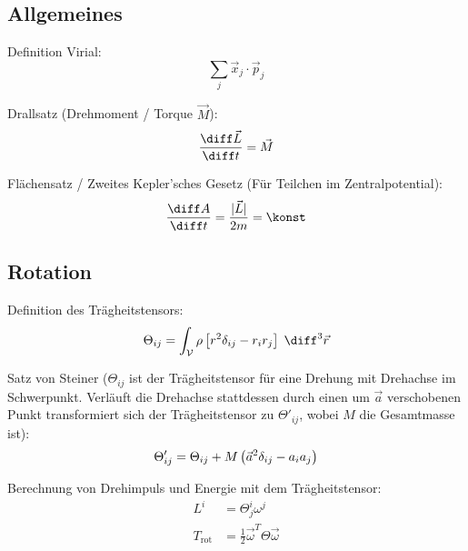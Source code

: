 \documentclass[11pt]{article}
\numberwithin{equation}{section}
\begin{document}
      \subsection{Allgemeines}
        Definition Virial:
        \begin{equation}
          \sum_j \vec{x}_j\cdot\vec{p}_j
        \end{equation}

        Drallsatz (Drehmoment / Torque $\vec{M}$):
        \begin{equation}
          \tder{\vec{L}}{t} = \vec{M}
        \end{equation}

        Flächensatz / Zweites Kepler'sches Gesetz (Für Teilchen im Zentralpotential):
        \begin{equation}
          \tder{A}{t} = \frac{\vbr{\vec{L}}}{2 m} = \konst
        \end{equation}

      \subsection{Rotation}
        Definition des Trägheitstensors:
        \begin{equation}
          \Theta_{ij}=\int_{\mathcal{V}} \rho \left[r^2\delta_{ij}-r_i r_j\right] \;\diff^3\vec{r}
        \end{equation}

        Satz von Steiner ($\Theta_{ij}$ ist der Trägheitstensor für eine Drehung mit Drehachse im Schwerpunkt. Verläuft die Drehachse stattdessen durch einen um $\vec{a}$ verschobenen Punkt transformiert sich der Trägheitstensor zu $\Theta'_{ij}$, wobei $M$ die Gesamtmasse ist):
        \begin{equation}
          \Theta'_{ij} = \Theta_{ij} + M\left( \vec{a}^2\delta_{ij} - a_i a_j \right)
        \end{equation}

        Berechnung von Drehimpuls und Energie mit dem  Trägheitstensor:
        \begin{equation}
          \begin{aligned}
            L^i &= \Theta^i_j \omega^j \\
            T_{\mathrm{rot}} &= \frac{1}{2}\vec{\omega}^T \Theta \vec{\omega}
          \end{aligned}
        \end{equation}
\end{document}
